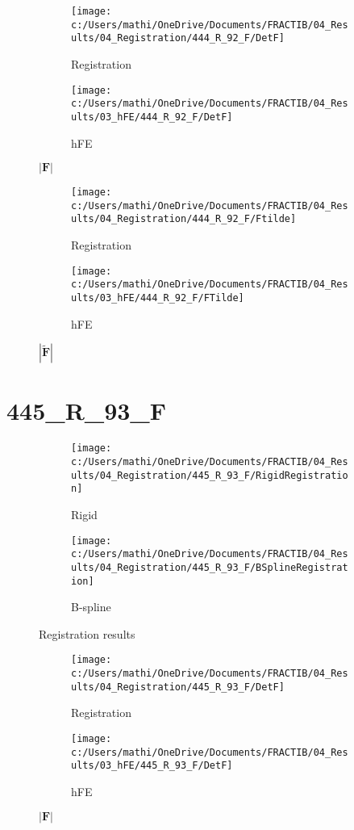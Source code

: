 \documentclass{article}%
\begin{document}
\begin{figure}[h!]%
\begin{subfigure}[b]{0.5\linewidth}%
\texttt{[image: c:/Users/mathi/OneDrive/Documents/FRACTIB/04\_Results/04\_Registration/444\_R\_92\_F/DetF]}%
\caption{Registration}%
\end{subfigure}%
\begin{subfigure}[b]{0.5\linewidth}%
\texttt{[image: c:/Users/mathi/OneDrive/Documents/FRACTIB/04\_Results/03\_hFE/444\_R\_92\_F/DetF]}%
\caption{hFE}%
\end{subfigure}%
\caption{$|\mathbf{F}|$}%
\end{figure}

%


\begin{figure}[h!]%
\begin{subfigure}[b]{0.5\linewidth}%
\texttt{[image: c:/Users/mathi/OneDrive/Documents/FRACTIB/04\_Results/04\_Registration/444\_R\_92\_F/Ftilde]}%
\caption{Registration}%
\end{subfigure}%
\begin{subfigure}[b]{0.5\linewidth}%
\texttt{[image: c:/Users/mathi/OneDrive/Documents/FRACTIB/04\_Results/03\_hFE/444\_R\_92\_F/FTilde]}%
\caption{hFE}%
\end{subfigure}%
\caption{$|\widetilde{\mathbf{F}}|$}%
\end{figure}

%
\newpage%
\section*{445\_R\_93\_F}%
\label{sec:445R93F}%


\begin{figure}[h!]%
\begin{subfigure}[b]{0.5\linewidth}%
\texttt{[image: c:/Users/mathi/OneDrive/Documents/FRACTIB/04\_Results/04\_Registration/445\_R\_93\_F/RigidRegistration]}%
\caption{Rigid}%
\end{subfigure}%
\begin{subfigure}[b]{0.5\linewidth}%
\texttt{[image: c:/Users/mathi/OneDrive/Documents/FRACTIB/04\_Results/04\_Registration/445\_R\_93\_F/BSplineRegistration]}%
\caption{B{-}spline}%
\end{subfigure}%
\caption{Registration results}%
\end{figure}

%


\begin{figure}[h!]%
\begin{subfigure}[b]{0.5\linewidth}%
\texttt{[image: c:/Users/mathi/OneDrive/Documents/FRACTIB/04\_Results/04\_Registration/445\_R\_93\_F/DetF]}%
\caption{Registration}%
\end{subfigure}%
\begin{subfigure}[b]{0.5\linewidth}%
\texttt{[image: c:/Users/mathi/OneDrive/Documents/FRACTIB/04\_Results/03\_hFE/445\_R\_93\_F/DetF]}%
\caption{hFE}%
\end{subfigure}%
\caption{$|\mathbf{F}|$}%
\end{figure}
\end{document}
